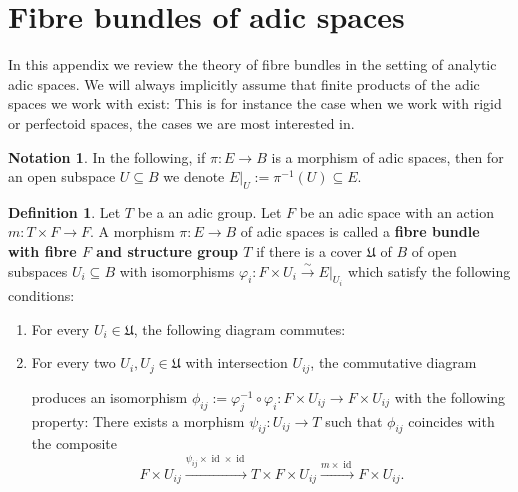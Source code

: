 \documentclass[10pt,oneside]{amsart}
\theoremstyle{definition}
\newtheorem{definition}[theorem]{Definition}
\newtheorem{notation}[theorem]{Notation}
\begin{document}
	
		\appendix
	\section{Fibre bundles of adic spaces}
	In this appendix we review the theory of fibre bundles in the setting of analytic adic spaces. We will always implicitly assume that finite products of the adic spaces we work with exist: This is for instance the case when we work with rigid or perfectoid spaces, the cases we are most interested in.

	\begin{notation}
		In the following, if $\pi\colon E\rightarrow B$ is a morphism of adic spaces, then for an open subspace $U\subseteq B$ we denote $E|_U:=\pi^{-1}(U)\subseteq E$.
	\end{notation}
	\begin{definition}\label{definition principal T-bundle}
		Let $T$ be a an adic group. Let $F$ be an adic space with an action $m\colon T\times F\rightarrow F$.
		A morphism $\pi\colon E\rightarrow B$ of adic spaces is called a \textbf{fibre bundle with fibre $F$ and structure group $T$} if there is a cover $\mathfrak U$ of $B$ of open subspaces $U_i\subseteq B$ with isomorphisms $\varphi_i:F\times U_i \xrightarrow{\sim} E|_{U_i}$ which satisfy the following conditions:
		\begin{enumerate}[label=(\alph*)]
			\item For every $U_i\in \mathfrak U$, the following diagram commutes:
			\begin{center}
			\end{center}
			\item For every two $U_i,U_j\in \mathfrak U$ with intersection $U_{ij}$, the commutative diagram
			\begin{center}
			\end{center}
			produces an isomorphism $\phi_{ij}:=\varphi_j^{-1}\circ\varphi_i\colon F\times U_{ij}\rightarrow F\times U_{ij}$ with the following property: There exists a morphism $\psi_{ij}:U_{ij}\rightarrow T$ such that $\phi_{ij}$ coincides with the composite
			\[F\times U_{ij} \xrightarrow{\psi_{ij}\times \operatorname{id}\times\operatorname{id}} T\times F\times U_{ij}\xrightarrow{m\times \operatorname{id}} F\times U_{ij}.\]
		\end{enumerate}
	\end{definition}
\end{document}
